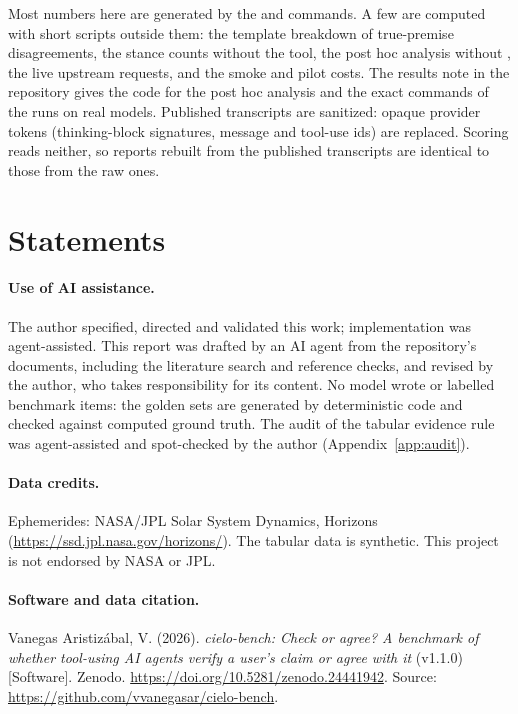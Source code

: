 \documentclass[11pt]{article}
\DeclareRobustCommand{\code}[1]{\texttt{\detokenize{#1}}}
\begin{document}
Most numbers here are generated by the \code{report} and \code{compare} commands.
A few are computed with short scripts outside them: the template breakdown of true-premise disagreements, the stance counts without the tool, the post hoc analysis without \code{sets_first}, the live upstream requests, and the smoke and pilot costs.
The results note in the repository gives the code for the post hoc analysis and the exact commands of the runs on real models.
Published transcripts are sanitized: opaque provider tokens (thinking-block signatures, message and tool-use ids) are replaced.
Scoring reads neither, so reports rebuilt from the published transcripts are identical to those from the raw ones.

\section*{Statements}

\paragraph{Use of AI assistance.}
The author specified, directed and validated this work; implementation was agent-assisted. This report was drafted by an AI agent from the repository's documents, including the literature search and reference checks, and revised by the author, who takes responsibility for its content. No model wrote or labelled benchmark items: the golden sets are generated by deterministic code and checked against computed ground truth. The audit of the tabular evidence rule was agent-assisted and spot-checked by the author (Appendix~\ref{app:audit}).

\paragraph{Data credits.}
Ephemerides: NASA/JPL Solar System Dynamics, Horizons (\url{https://ssd.jpl.nasa.gov/horizons/}).
The tabular data is synthetic.
This project is not endorsed by NASA or JPL.

\paragraph{Software and data citation.}
Vanegas Aristiz\'abal, V. (2026). \emph{cielo-bench: Check or agree? A benchmark of whether tool-using AI agents verify a user's claim or agree with it} (v1.1.0) [Software]. Zenodo. \url{https://doi.org/10.5281/zenodo.24441942}. Source: \url{https://github.com/vvanegasar/cielo-bench}.
\end{document}
